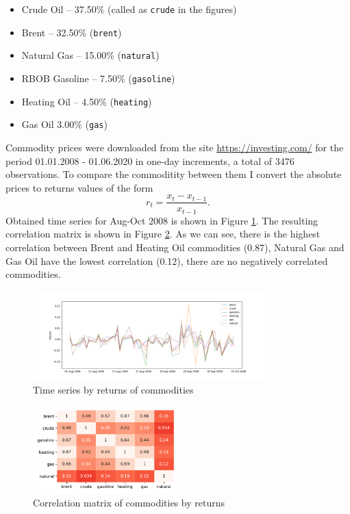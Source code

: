 \documentclass{article}
\begin{document}
\begin{itemize}
    \item Crude Oil -- 37.50\% (called as \texttt{crude} in the figures)
    \item Brent -- 32.50\% (\texttt{brent})
    \item Natural Gas -- 15.00\% (\texttt{natural})
    \item RBOB Gasoline -- 7.50\% (\texttt{gasoline})
    \item Heating Oil -- 4.50\% (\texttt{heating})
    \item Gas Oil 3.00\% (\texttt{gas})
\end{itemize}

Commodity prices were downloaded from the site \url{https://investing.com/} for the period 01.01.2008 - 01.06.2020 in one-day increments, a total of 3476 observations. To compare the commoditity between them I convert the absolute prices to returns values of the form
$$r_t = \frac{x_t - x_{t-1}}{x_{t-1}}.$$
Obtained time series for Aug-Oct 2008 is shown in Figure \ref{fig:returns}. The resulting correlation matrix is shown in Figure \ref{fig:heatmap}. As we can see, there is the highest correlation between Brent and Heating Oil commodities (0.87), Natural Gas and Gas Oil have the lowest correlation (0.12), there are no negatively correlated commodities.

\begin{figure}[h]
    \centering
    \includegraphics[width=0.8\textwidth]{pics/returns.png}
    \caption{Time series by returns of commodities}
    \label{fig:returns}
\end{figure}

\begin{figure}[h]
    \centering
    \includegraphics[width=0.5\textwidth]{pics/heatmap.pdf}
    \caption{Correlation matrix of commodities by returns}
    \label{fig:heatmap}
\end{figure}
\end{document}

